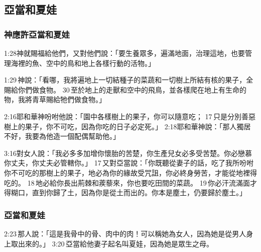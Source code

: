 
\subsection{亞當和夏娃}
\subsubsection{神應許亞當和夏娃}
1:28神就賜福給他們，又對他們說：「要生養眾多，遍滿地面，治理這地，也要管理海裡的魚、空中的鳥和地上各樣行動的活物。」 

1:29 神說：「看哪，我將遍地上一切結種子的菜蔬和一切樹上所結有核的果子，全賜給你們做食物。 30 至於地上的走獸和空中的飛鳥，並各樣爬在地上有生命的物，我將青草賜給牠們做食物。」

2:16耶和華神吩咐他說：「園中各樣樹上的果子，你可以隨意吃； 17 只是分別善惡樹上的果子，你不可吃，因為你吃的日子必定死。」
2:18耶和華神說：「那人獨居不好，我要為他造一個配偶幫助他。」

3:16對女人說：「我必多多加增你懷胎的苦楚，你生產兒女必多受苦楚。你必戀慕你丈夫，你丈夫必管轄你。」 17 又對亞當說：「你既聽從妻子的話，吃了我所吩咐你不可吃的那樹上的果子，地必為你的緣故受咒詛，你必終身勞苦，才能從地裡得吃的。 18 地必給你長出荊棘和蒺藜來，你也要吃田間的菜蔬。 19 你必汗流滿面才得糊口，直到你歸了土，因為你是從土而出的。你本是塵土，仍要歸於塵土。」


\subsubsection{亞當和夏娃}
2:23 那人說：「這是我骨中的骨、肉中的肉！可以稱她為女人，因為她是從男人身上取出來的。」
3:20 亞當給他妻子起名叫夏娃，因為她是眾生之母。

